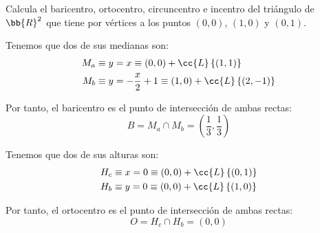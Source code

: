 \begin{ejercicio}
    Calcula el baricentro, ortocentro, circuncentro e incentro del triángulo de $\bb{R}^2$ que tiene por vértices a los puntos $(0, 0)$, $(1, 0)$ y $(0, 1)$.

    \begin{figure}[H]
        \centering
    \end{figure}

    Tenemos que dos de sus medianas son:
    \begin{align*}
        M_a & \equiv y=x \equiv (0,0) + \cc{L}\left\{(1,1)\right\}\\
        M_b & \equiv y=-\frac{x}{2}+1 \equiv (1,0) + \cc{L}\left\{(2,-1)\right\}
    \end{align*}

    Por tanto, el baricentro es el punto de intersección de ambas rectas:
    \begin{equation*}
        B=M_a \cap M_b = \left(\frac{1}{3}, \frac{1}{3} \right)
    \end{equation*}

    Tenemos que dos de sus alturas son:
    \begin{align*}
        H_c & \equiv x=0 \equiv (0,0) + \cc{L}\left\{(0, 1)\right\}\\
        H_b & \equiv y=0 \equiv (0,0) + \cc{L}\left\{(1,0)\right\}
    \end{align*}

    Por tanto, el ortocentro es el punto de intersección de ambas rectas:
    \begin{equation*}
        O=H_c \cap H_b = (0,0)
    \end{equation*}


\end{ejercicio}

